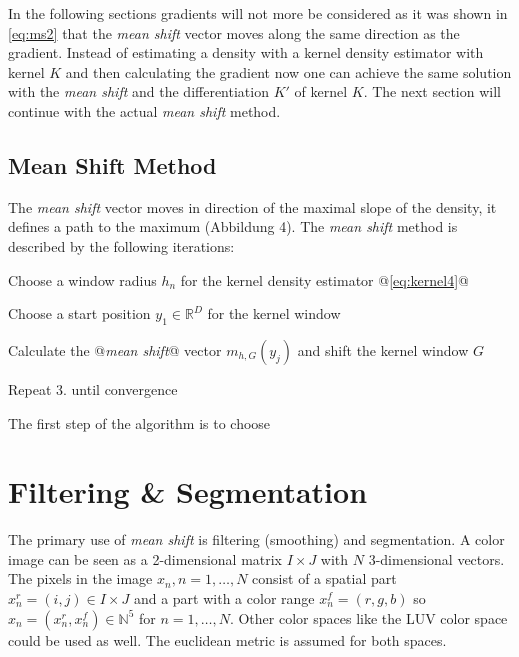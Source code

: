 In the following sections gradients will not more be considered as it was shown
in \autoref{eq:ms2} that the \emph{mean shift} vector moves along the same
direction as the gradient. Instead of estimating a density with a kernel 
density estimator with kernel $K$ and then calculating the gradient now one can
achieve the same solution with the \emph{mean shift} and the differentiation
$K'$ of kernel $K$. The next section will continue with the actual \emph{mean shift}
method.

\subsection{Mean Shift Method} 
\label{sec:mean_shift_method}

The \emph{mean shift} vector moves in direction of the maximal slope of the
density, it defines a path to the maximum (Abbildung 4). The \emph{mean shift}
method is described by the following iterations:

\begin{aenumerate}
  \label{enum:ms0}
	\item Choose a window radius $h_n$ for the kernel density estimator @\autoref{eq:kernel4}@
  	\item Choose a start position $y_1 \in \mathbb{R}^D$ for the kernel window
   	\item Calculate the @\emph{mean shift}@ vector $m_{h,G}(y_j)$ and shift the kernel window $G$
	\item Repeat 3. until convergence
\end{aenumerate}


The first step of the algorithm is to choose 



\section{Filtering {\upshape\&} Segmentation} %
\label{sec:filtering_segmentation}
The primary use of \emph{mean shift} is filtering (smoothing) and segmentation. 
A color image can be seen as a 2-dimensional matrix $I \times J$ with $N$ 
3-dimensional vectors. The pixels in the image $x_n, n = 1, \ldots , N$ consist of
a spatial part $x_n^r = (i,j) \in I \times J$ and a part with a color range
$x_n^f = (r,g,b)$ so $x_n = (x_n^r, x_n^f) \in \mathbb{N}^5$ for $n = 1, \ldots , N$.
Other color spaces like the \gls{LUV} color space could be used as well. The 
euclidean metric is assumed for both spaces. 


